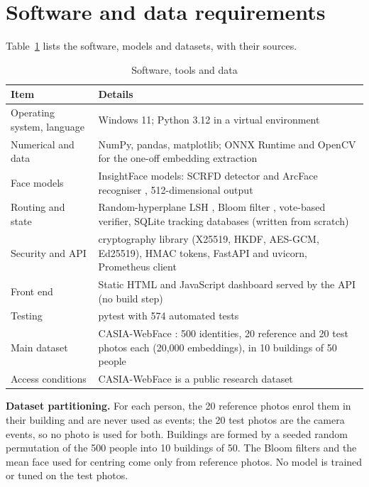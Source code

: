 \documentclass[12pt,a4paper,oneside]{report}
\begin{document}
\section{Software and data requirements}
Table~\ref{tab:software} lists the software, models and datasets, with their sources.

\begin{table}[htbp]
\centering
\caption{Software, tools and data}\label{tab:software}
{\small\setlength{\tabcolsep}{4pt}\renewcommand{\arraystretch}{1.2}
\begin{tabular}{|p{3.59cm}|p{10.99cm}|}\hline
\textbf{Item} & \textbf{Details}\\\hline
Operating system, language & Windows 11; Python 3.12 in a virtual environment\\\hline
Numerical and data & NumPy, pandas, matplotlib; ONNX Runtime and OpenCV for the one-off embedding extraction\\\hline
Face models & InsightFace models: SCRFD detector \cite{ref18} and ArcFace recogniser \cite{ref17}, 512-dimensional output\\\hline
Routing and state & Random-hyperplane LSH \cite{ref14}, Bloom filter \cite{ref12}, vote-based verifier, SQLite tracking databases (written from scratch)\\\hline
Security and API & cryptography library (X25519, HKDF, AES-GCM, Ed25519), HMAC tokens, FastAPI and uvicorn, Prometheus client\\\hline
Front end & Static HTML and JavaScript dashboard served by the API (no build step)\\\hline
Testing & pytest with 574 automated tests\\\hline
Main dataset & CASIA-WebFace \cite{ref19}: 500 identities, 20 reference and 20 test photos each (20,000 embeddings), in 10 buildings of 50 people\\\hline
Access conditions & CASIA-WebFace is a public research dataset\\\hline
\end{tabular}}
\end{table}

\textbf{Dataset partitioning.} For each person, the 20 reference photos enrol them in their building and are never used as events; the 20 test photos are the camera events, so no photo is used for both. Buildings are formed by a seeded random permutation of the 500 people into 10 buildings of 50. The Bloom filters and the mean face used for centring come only from reference photos. No model is trained or tuned on the test photos.
\end{document}
